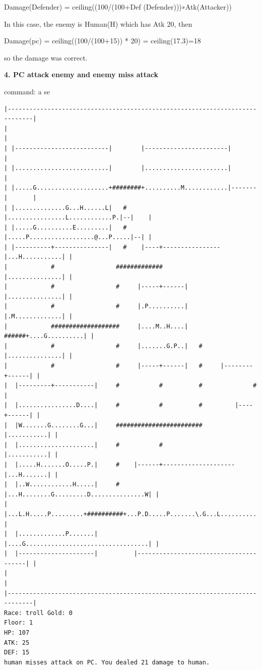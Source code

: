 \documentclass[11pt]{article}
\theoremstyle{plain}
\begin{document}
\textsf{Damage(Defender) = ceiling((100/(100+Def (Defender)))∗Atk(Attacker))}

In this case, the enemy is Human(H) which has Atk 20, then

\textsf{Damage(pc) = ceiling((100/(100+15)) * 20) = ceiling(17.3)=18}

so the damage was correct.




\newpage
\textbf{4. PC attack enemy and enemy miss attack}

command: a se
\begin{Verbatim}[fontsize=\scriptsize]
|-----------------------------------------------------------------------------|
|                                                                             |
| |--------------------------|        |-----------------------|               |
| |..........................|        |.......................|               |
| |.....G....................+########+..........M............|-------|       |
| |..............G...H......L|   #    |................L............P.|--|    |
| |.....G..........E.........|   #    |.....P..................@...P.....|--| |
| |----------+---------------|   #    |----+----------------|...H...........| |
|            #                 #############                |...............| |
|            #                 #     |-----+------|         |...............| |
|            #                 #     |.P..........|         |.M.............| |
|            ###################     |....M..H....|   ######+....G..........| |
|            #                 #     |.......G.P..|   #     |...............| |
|            #                 #     |-----+------|   #     |--------+------| |
|  |---------+-----------|     #           #          #              #        |
|  |................D....|     #           #          #         |----+------| |
|  |W.......G........G...|     ########################         |...........| |
|  |.....................|     #           #                    |...........| |
|  |.....H.......O.....P.|     #    |------+--------------------|...H.......| |
|  |..W............H.....|     #    |...H........G.........D...............W| |
|  |...L.H.....P.........+##########+...P.D.....P.......\.G...L.............| |
|  |.............P.......|          |....G..................................| |
|  |---------------------|          |---------------------------------------| |
|                                                                             |
|-----------------------------------------------------------------------------|
Race: troll Gold: 0                                                    Floor: 1
HP: 107
ATK: 25
DEF: 15
human misses attack on PC. You dealed 21 damage to human. 
\end{Verbatim}
\end{document}
